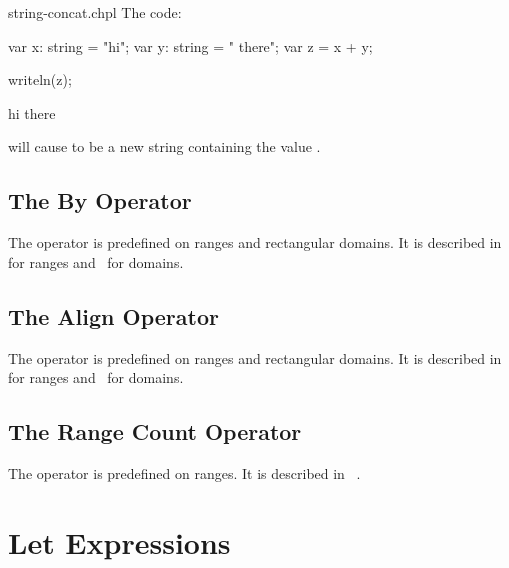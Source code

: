 \begin{chapelexample}{string-concat.chpl}
The code:
\begin{chapel}
var x: string = "hi";
var y: string = " there";
var z = x + y;
\end{chapel}
\begin{chapelnoprint}
writeln(z);
\end{chapelnoprint}
\begin{chapeloutput}
hi there
\end{chapeloutput}
will cause  to be a new string containing the value .
\end{chapelexample}

\subsection{The By Operator}
\label{The_By_Operator}

The operator  is predefined on ranges and rectangular domains.
It is described in~ for ranges
and~ for domains.

\subsection{The Align Operator}
\label{The_Align_Operator}

The operator  is predefined on ranges and rectangular domains.
It is described in~ for ranges
and~ for domains.

\subsection{The Range Count Operator}
\label{The_Range_Count_Operator}

The operator \chpl{#} is predefined on ranges. It is described
in ~.

\section{Let Expressions}
\label{Let_Expressions}


